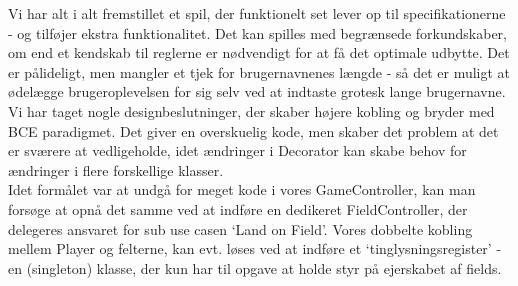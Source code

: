 Vi har alt i alt fremstillet et spil, der funktionelt set lever op til
specifikationerne - og tilføjer ekstra funktionalitet. Det kan spilles med
begrænsede forkundskaber, om end et kendskab til reglerne er nødvendigt for at
få det optimale udbytte. Det er pålideligt, men mangler et tjek for
brugernavnenes længde - så det er muligt at ødelægge brugeroplevelsen for sig
selv ved at indtaste grotesk lange brugernavne.\\
\indent Vi har taget nogle designbeslutninger, der skaber højere kobling og
bryder med BCE paradigmet. Det giver en overskuelig kode, men skaber det problem at det er
sværere at vedligeholde, idet ændringer i Decorator kan skabe behov for
ændringer i flere forskellige klasser.\\
\indent Idet formålet var at undgå for meget kode i vores GameController, kan
man forsøge at opnå det samme ved at indføre en dedikeret FieldController, der
delegeres ansvaret for sub use casen ‘Land on Field’. Vores dobbelte kobling
mellem Player og felterne, kan evt. løses ved at indføre et
‘tinglysningsregister’ - en (singleton) klasse, der kun har til opgave at holde
styr på ejerskabet af fields.
